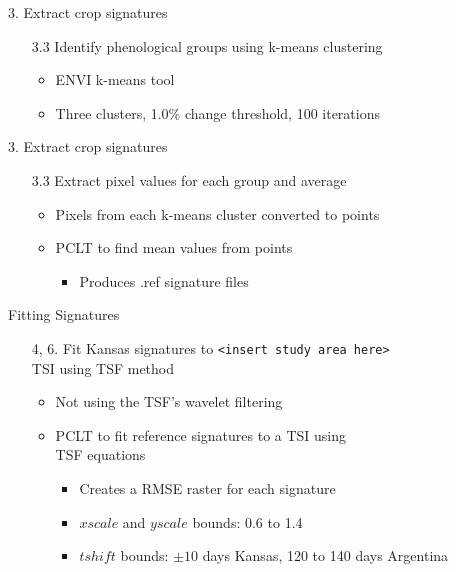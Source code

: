 \documentclass[draft,compress]{beamer}
\begin{document}
\begin{frame}{3. Extract crop signatures}
\begin{enumerate}
  \item[3.3] Identify phenological groups using k-means clustering
  \begin{itemize}
    \item<1-> ENVI k-means tool
    \item<2-> Three clusters, 1.0\% change threshold, 100 iterations
  \end{itemize}
\end{enumerate}
\end{frame}

\begin{frame}{3. Extract crop signatures}
\begin{enumerate}
  \item[3.3] Extract pixel values for each group and average
  \begin{itemize}
    \item<1-> Pixels from each k-means cluster converted to points
    \item<2-> PCLT to find mean values from points
    \begin{itemize}
      \item<2-> Produces .ref signature files
    \end{itemize}
  \end{itemize}
\end{enumerate}
\end{frame}

\begin{frame}{Fitting Signatures}
\begin{enumerate}
  \item[4, 6.] Fit Kansas signatures to {\footnotesize\texttt{<insert study area here>}}\\TSI using TSF method
  \begin{itemize}
    \item<2-> Not using the TSF's wavelet filtering
    \item<3-> PCLT to fit reference signatures to a TSI using\\TSF equations
    \begin{itemize}
      \item<3-> Creates a RMSE raster for each signature
      \item<4-> $xscale$ and $yscale$ bounds: 0.6 to 1.4
      \item<5-> $tshift$ bounds: $\pm10$ days Kansas, 120 to 140 days Argentina
    \end{itemize}
  \end{itemize}
\end{enumerate}
\end{frame}
\end{document}
